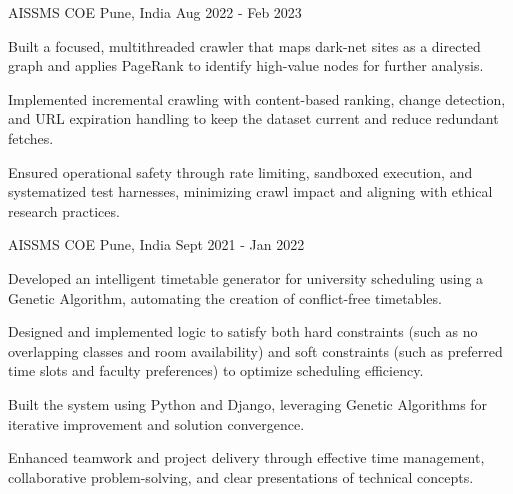 

\begin{cventries}

    \cventry
    {AISSMS COE} %
    {} %
    {Pune, India} %
    {Aug 2022 - Feb 2023} %
    {
        \begin{cvitems} %
            \item {}
            \item {Built a focused, multithreaded crawler that maps dark-net sites as a directed graph and applies PageRank to identify high-value nodes for further analysis.}
            \item {Implemented incremental crawling with content-based ranking, change detection, and URL expiration handling to keep the dataset current and reduce redundant fetches.}
            \item {Ensured operational safety through rate limiting, sandboxed execution, and systematized test harnesses, minimizing crawl impact and aligning with ethical research practices.}
        \end{cvitems}
    }

    \cventry
    {AISSMS COE} %
    {} %
    {Pune, India} %
    {Sept 2021 - Jan 2022} %
    {
        \begin{cvitems} %
            \item {Developed an intelligent timetable generator for university scheduling using a Genetic Algorithm, automating the creation of conflict-free timetables.}
            \item {Designed and implemented logic to satisfy both hard constraints (such as no overlapping classes and room availability) and soft constraints (such as preferred time slots and faculty preferences) to optimize scheduling efficiency.}
            \item {Built the system using Python and Django, leveraging Genetic Algorithms for iterative improvement and solution convergence.}
            \item {Enhanced teamwork and project delivery through effective time management, collaborative problem-solving, and clear presentations of technical concepts.}
        \end{cvitems}
    }


\end{cventries}
